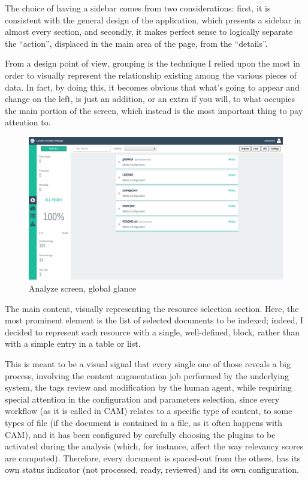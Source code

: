 \documentclass[12pt,svgnames]{memoir}
\begin{document}
The choice of having a sidebar comes from two considerations: first, it
is consistent with the general design of the application, which presents
a sidebar in almost every section, and secondly, it makes perfect sense
to logically separate the ``action'', displaced in the main area of the
page, from the ``details''.

From a design point of view, grouping is the technique I relied upon the
most in order to visually represent the relationship existing among the
various pieces of data. In fact, by doing this, it becomes obvious that
what's going to appear and change on the left, is just an addition, or
an extra if you will, to what occupies the main portion of the screen,
which instead is the most important thing to pay attention to.

\begin{figure}[htbp]
\centering
\includegraphics{./src/img/analyze-screen.png}
\caption{Analyze screen, global glance}
\end{figure}

The main content, visually representing the resource selection section.
Here, the most prominent element is the list of selected documents to be
indexed; indeed, I decided to represent each resource with a single,
well-defined, block, rather than with a simple entry in a table or list.

This is meant to be a visual signal that every single one of those
reveals a big process, involving the content augmentation job performed
by the underlying system, the tags review and modification by the human
agent, while requiring special attention in the configuration and
parameters selection, since every workflow (as it is called in CAM)
relates to a specific type of content, to some types of file (if the
document is contained in a file, as it often happens with CAM), and it
has been configured by carefully choosing the plugins to be activated
during the analysis (which, for instance, affect the way relevancy
scores are computed). Therefore, every document is spaced-out from the
others, has its own status indicator (not processed, ready, reviewed)
and its own configuration.
\end{document}
